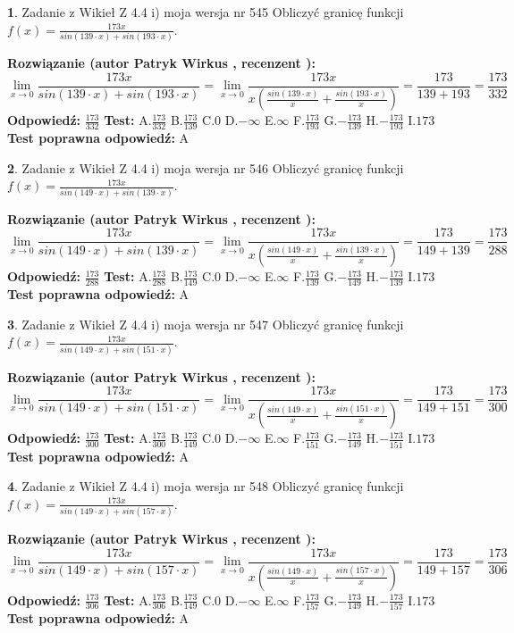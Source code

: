 \documentclass[12pt, a4paper]{article}
\theoremstyle{definition} %
\newtheorem{zad}{}
\newcommand{\zadStart}[1]{\begin{zad}#1\newline}
\newcommand{\zadStop}{\end{zad}}
\newcommand{\rozwStart}[2]{\noindent \textbf{Rozwiązanie (autor #1 , recenzent #2): }\newline}
\newcommand{\rozwStop}{\newline}
\newcommand{\odpStart}{\noindent \textbf{Odpowiedź:}\newline}
\newcommand{\odpStop}{\newline}
\newcommand{\testStart}{\noindent \textbf{Test:}\newline}
\newcommand{\testStop}{\newline}
\newcommand{\kluczStart}{\noindent \textbf{Test poprawna odpowiedź:}\newline}
\newcommand{\kluczStop}{\newline}
\begin{document}
\zadStart{Zadanie z Wikieł Z 4.4 i) moja wersja nr 545}
Obliczyć granicę funkcji $f(x)=\frac{173x}{sin(139\cdot x) +sin(193\cdot x)}$.
\zadStop
\rozwStart{Patryk Wirkus}{}
$$\lim\limits_{x\to 0}\frac{173x}{sin(139\cdot x) +sin(193\cdot x)}=\lim\limits_{x\to 0}\frac{173x}{x(\frac{sin(139\cdot x)}{x}+\frac{sin(193\cdot x)}{x})}=\frac{173}{139+193} = \frac{173}{332}$$
\rozwStop
\odpStart
$\frac{173}{332}$
\odpStop
\testStart
A.$\frac{173}{332}$
B.$\frac{173}{139}$
C.$0$
D.$-\infty$
E.$\infty$
F.$\frac{173}{193}$
G.$-\frac{173}{139}$
H.$-\frac{173}{193}$
I.$173$
\testStop
\kluczStart
A
\kluczStop



\zadStart{Zadanie z Wikieł Z 4.4 i) moja wersja nr 546}
Obliczyć granicę funkcji $f(x)=\frac{173x}{sin(149\cdot x) +sin(139\cdot x)}$.
\zadStop
\rozwStart{Patryk Wirkus}{}
$$\lim\limits_{x\to 0}\frac{173x}{sin(149\cdot x) +sin(139\cdot x)}=\lim\limits_{x\to 0}\frac{173x}{x(\frac{sin(149\cdot x)}{x}+\frac{sin(139\cdot x)}{x})}=\frac{173}{149+139} = \frac{173}{288}$$
\rozwStop
\odpStart
$\frac{173}{288}$
\odpStop
\testStart
A.$\frac{173}{288}$
B.$\frac{173}{149}$
C.$0$
D.$-\infty$
E.$\infty$
F.$\frac{173}{139}$
G.$-\frac{173}{149}$
H.$-\frac{173}{139}$
I.$173$
\testStop
\kluczStart
A
\kluczStop



\zadStart{Zadanie z Wikieł Z 4.4 i) moja wersja nr 547}
Obliczyć granicę funkcji $f(x)=\frac{173x}{sin(149\cdot x) +sin(151\cdot x)}$.
\zadStop
\rozwStart{Patryk Wirkus}{}
$$\lim\limits_{x\to 0}\frac{173x}{sin(149\cdot x) +sin(151\cdot x)}=\lim\limits_{x\to 0}\frac{173x}{x(\frac{sin(149\cdot x)}{x}+\frac{sin(151\cdot x)}{x})}=\frac{173}{149+151} = \frac{173}{300}$$
\rozwStop
\odpStart
$\frac{173}{300}$
\odpStop
\testStart
A.$\frac{173}{300}$
B.$\frac{173}{149}$
C.$0$
D.$-\infty$
E.$\infty$
F.$\frac{173}{151}$
G.$-\frac{173}{149}$
H.$-\frac{173}{151}$
I.$173$
\testStop
\kluczStart
A
\kluczStop



\zadStart{Zadanie z Wikieł Z 4.4 i) moja wersja nr 548}
Obliczyć granicę funkcji $f(x)=\frac{173x}{sin(149\cdot x) +sin(157\cdot x)}$.
\zadStop
\rozwStart{Patryk Wirkus}{}
$$\lim\limits_{x\to 0}\frac{173x}{sin(149\cdot x) +sin(157\cdot x)}=\lim\limits_{x\to 0}\frac{173x}{x(\frac{sin(149\cdot x)}{x}+\frac{sin(157\cdot x)}{x})}=\frac{173}{149+157} = \frac{173}{306}$$
\rozwStop
\odpStart
$\frac{173}{306}$
\odpStop
\testStart
A.$\frac{173}{306}$
B.$\frac{173}{149}$
C.$0$
D.$-\infty$
E.$\infty$
F.$\frac{173}{157}$
G.$-\frac{173}{149}$
H.$-\frac{173}{157}$
I.$173$
\testStop
\kluczStart
A
\kluczStop
\end{document}
